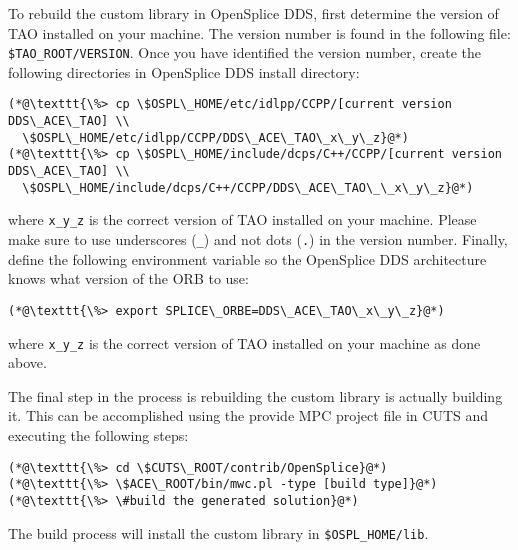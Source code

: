 To rebuild the custom library in OpenSplice DDS, first determine
the version of TAO installed on your machine. The version number is
found in the following file: \texttt{\$TAO\_ROOT/VERSION}. Once you
have identified the version number, create the following directories
in OpenSplice DDS install directory:
\begin{lstlisting}
(*@\texttt{\%> cp \$OSPL\_HOME/etc/idlpp/CCPP/[current version DDS\_ACE\_TAO] \\
  \$OSPL\_HOME/etc/idlpp/CCPP/DDS\_ACE\_TAO\_x\_y\_z}@*)
(*@\texttt{\%> cp \$OSPL\_HOME/include/dcps/C++/CCPP/[current version DDS\_ACE\_TAO] \\
  \$OSPL\_HOME/include/dcps/C++/CCPP/DDS\_ACE\_TAO\_\_x\_y\_z}@*)
\end{lstlisting}
where \texttt{x\_y\_z} is the correct version of TAO installed on your 
machine. Please make sure to use underscores (\texttt{\_}) and not 
dots (\texttt{.}) in the version number. Finally, define the following 
environment variable so the OpenSplice DDS architecture knows what 
version of the ORB to use:
\begin{lstlisting}
(*@\texttt{\%> export SPLICE\_ORBE=DDS\_ACE\_TAO\_x\_y\_z}@*)
\end{lstlisting}
where \texttt{x\_y\_z} is the correct version of TAO installed on 
your machine as done above.

The final step in the process is rebuilding the custom library is
actually building it. This can be accomplished using the provide
MPC project file in CUTS and executing the following steps: 
\begin{lstlisting}
(*@\texttt{\%> cd \$CUTS\_ROOT/contrib/OpenSplice}@*)
(*@\texttt{\%> \$ACE\_ROOT/bin/mwc.pl -type [build type]}@*)
(*@\texttt{\%> \#build the generated solution}@*)
\end{lstlisting}

The build process will install the custom library in 
\texttt{\$OSPL\_HOME/lib}.

